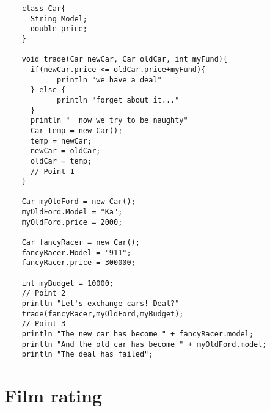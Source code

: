 \documentclass{article}
\begin{document}
\begin{verbatim}
    class Car{
      String Model;
      double price;
    }
    
    void trade(Car newCar, Car oldCar, int myFund){
      if(newCar.price <= oldCar.price+myFund){
            println "we have a deal"
      } else {
            println "forget about it..."
      }
      println "  now we try to be naughty"
      Car temp = new Car();
      temp = newCar;
      newCar = oldCar;
      oldCar = temp;
      // Point 1
    }
    
    Car myOldFord = new Car();
    myOldFord.Model = "Ka";
    myOldFord.price = 2000;
    
    Car fancyRacer = new Car();
    fancyRacer.Model = "911";
    fancyRacer.price = 300000;
    
    int myBudget = 10000;
    // Point 2
    println "Let's exchange cars! Deal?"
    trade(fancyRacer,myOldFord,myBudget);
    // Point 3
    println "The new car has become " + fancyRacer.model;
    println "And the old car has become " + myOldFord.model;
    println "The deal has failed";
\end{verbatim}


\section{Film rating}
\label{sec:film-rating}
\end{document}
